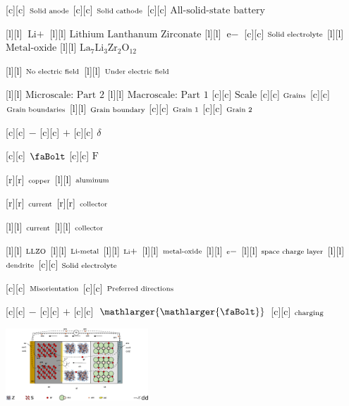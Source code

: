 \footnotesize

[c][c] {$\text{\scriptsize Solid anode}$}
[c][c] {$\text{\scriptsize Solid cathode}$}
[c][c] {$\text{All-solid-state battery}$}

[l][l] {$\text{Li}+$}
[l][l] {$\text{Lithium Lanthanum Zirconate}$}
[l][l] {$\text{e}-$}
[c][c] {$\text{\scriptsize Solid electrolyte}$}
[l][l] {$\text{Metal-oxide}$}
[l][l] {$\text{La}_{7}\text{Li}_{3}\text{Zr}_{2}\text{O}_{12}$}

[l][l] {$\text{\scriptsize  No electric field}$}
[l][l] {$\text{\scriptsize  Under electric field}$}

[l][l] {$\text{Microscale: Part 2}$}
[l][l] {$\text{Macroscale: Part 1}$}
[c][c] {$\text{Scale}$}
[c][c] {$\text{\scriptsize Grains}$}
[c][c] {$\text{\scriptsize Grain boundaries}$}
[l][l] {$\text{\scriptsize Grain boundary}$}
[c][c] {$\text{\scriptsize Grain 1}$}
[c][c] {$\text{\scriptsize Grain 2}$}

[c][c] {$-$}
[c][c] {$+$}
[c][c] {$\delta$}

[c][c] {$\text{\faBolt}$}
[c][c] {$\text{F}$}

[r][r] {$\scriptsize  \text{copper}$}
[l][l] {$\scriptsize  \text{aluminum}$}

[r][r] {$\scriptsize  \text{current}$}
[r][r] {$\scriptsize  \text{collector}$}

[l][l] {$\scriptsize  \text{current}$}
[l][l] {$\scriptsize  \text{collector}$}

[l][l] {$\scriptsize \text{LLZO}$}
[l][l] {$\scriptsize \text{Li-metal}$}
[l][l] {$\scriptsize \text{Li}+$}
[l][l] {$\scriptsize \text{metal-oxide}$}
[l][l] {$\scriptsize \text{e}-$}
[l][l] {$\scriptsize \text{space charge layer}$}
[l][l] {$\scriptsize \text{dendrite}$}
[c][c] {$\scriptsize  \text{Solid electrolyte}$}

[c][c] {$\scriptsize  \text{Misorientation}$}
[c][c] {$\scriptsize  \text{Preferred directions}$}

[c][c] {$-$}
[c][c] {$+$}
[c][c] {$\mathlarger{\mathlarger{\text{\faBolt}}}$}
[c][c] {$\scriptsize  \text{charging}$}

\includegraphics[width=0.4\textwidth]{dendrite_pdirection_battonly.eps}